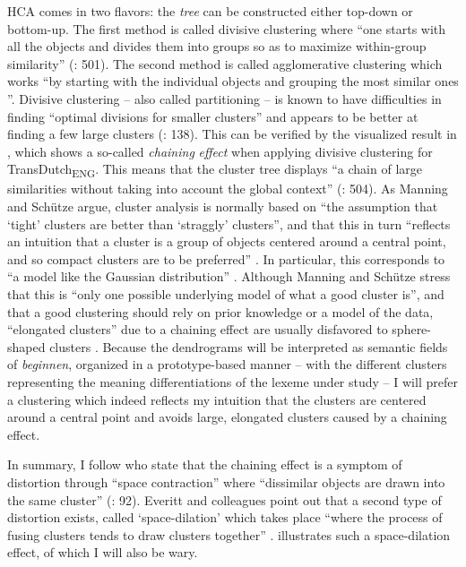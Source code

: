 HCA comes in two flavors: the \textit{tree} can be constructed either top-down or bottom-up. The first method is called divisive clustering where “one starts with all the objects and divides them into groups so as to maximize within-group similarity” (\citealt{manning_foundations_1999}: 501). The second method is called agglomerative clustering which works “by starting with the individual objects and grouping the most similar ones \citep[500-501]{manning_foundations_1999}”. Divisive clustering – also called partitioning – is known to have difficulties in finding “optimal divisions for smaller clusters” and appears to be better at finding a few large clusters (\citealt{baayen_analyzing_2008}: 138). This can be verified by the visualized result in , which shows a so-called \textit{chaining} \textit{effect} when applying divisive clustering for TransDutch\textsubscript{ENG}. This means that the cluster tree displays “a chain of large similarities without taking into account the global context” (\citealt{manning_foundations_1999}: 504). As Manning and Schütze argue, cluster analysis is normally based on “the assumption that ‘tight’ clusters are better than ‘straggly’ clusters”, and that this in turn “reflects an intuition that a cluster is a group of objects centered around a central point, and so compact clusters are to be preferred” \citep[506]{manning_foundations_1999}. In particular, this corresponds to “a model like the Gaussian distribution” \citep[506]{manning_foundations_1999}. Although Manning and Schütze stress that this is “only one possible underlying model of what a good cluster is”, and that a good clustering should rely on prior knowledge or a model of the data, “elongated clusters” due to a chaining effect are usually disfavored to sphere-shaped clusters \citep[506]{manning_foundations_1999}. Because the dendrograms will be interpreted as semantic fields of \textit{beginnen}, organized in a prototype-based manner – with the different clusters representing the meaning differentiations of the lexeme under study – I will prefer a clustering which indeed reflects my intuition that the clusters are centered around a central point and avoids large, elongated clusters caused by a chaining effect.



In summary, I follow \citet[92]{everitt_cluster_2011} who state that the chaining effect is a symptom of distortion through “space contraction” where “dissimilar objects are drawn into the same cluster” (\citealt{everitt_cluster_2011}: 92). Everitt and colleagues point out that a second type of distortion exists, called ‘space-dilation’ which takes place “where the process of fusing clusters tends to draw clusters together” \citet[92]{everitt_cluster_2011}.  illustrates such a space-dilation effect, of which I will also be wary.


